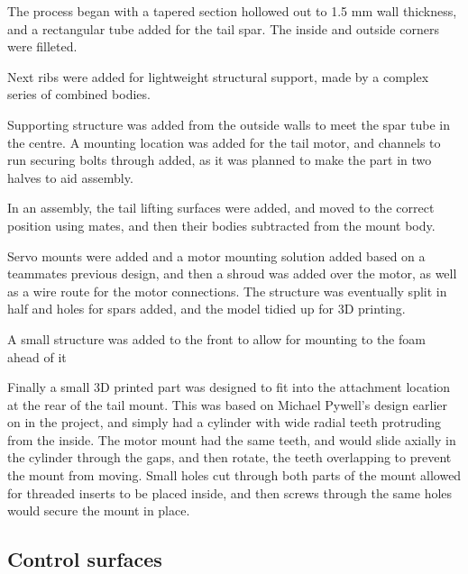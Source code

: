 \documentclass[../../main.tex]{subfiles}
\begin{document}
The process began with a tapered section hollowed out to 1.5 mm wall thickness, and a rectangular tube added for the tail spar.
The inside and outside corners were filleted. 

Next ribs were added for lightweight structural support, made by a complex series of combined bodies.  

Supporting structure was added from the outside walls to meet the spar tube in the centre.
A mounting location was added for the tail motor, and channels to run securing bolts through added, as it was planned to make the part in two halves to aid assembly.  

In an assembly, the tail lifting surfaces were added, and moved to the correct position using mates, and then their bodies subtracted from the mount body. 

Servo mounts were added and a motor mounting solution added based on a teammates previous design, and then a shroud was added over the motor, as well as a wire route for the motor connections.
The structure was eventually split in half and holes for spars added, and the model tidied up for 3D printing. 

A small structure was added to the front to allow for mounting to the foam ahead of it 

Finally a small 3D printed part was designed to fit into the attachment location at the rear of the tail mount.
This was based on Michael Pywell’s design earlier on in the project, and simply had a cylinder with wide radial teeth protruding from the inside.
The motor mount had the same teeth, and would slide axially in the cylinder through the gaps, and then rotate, the teeth overlapping to prevent the mount from moving.
Small holes cut through both parts of the mount allowed for threaded inserts to be placed inside, and then screws through the same holes would secure the mount in place. 


\subsection{Control surfaces} \label{sec:design-process:final-design-proposal:control-surfaces}
\end{document}
